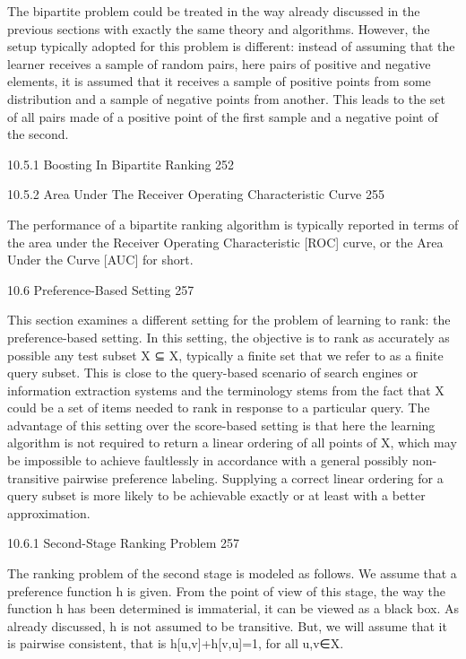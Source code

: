 The bipartite problem could be treated in the way already discussed in the previous sections with exactly the same theory and algorithms. However, the setup typically adopted for this problem is different: instead of assuming that the learner receives a sample of random pairs, here pairs of positive and negative elements, it is assumed that it receives a sample of positive points from some distribution and a sample of negative points from another. This leads to the set of all pairs made of a positive point of the first sample and a negative point of the second.

10.5.1 Boosting In Bipartite Ranking 252



10.5.2 Area Under The Receiver Operating Characteristic Curve 255

The performance of a bipartite ranking algorithm is typically reported in terms of the area under the Receiver Operating Characteristic [ROC] curve, or the Area Under the Curve [AUC] for short.

10.6 Preference-Based Setting 257

This section examines a different setting for the problem of learning to rank: the preference-based setting. In this setting, the objective is to rank as accurately as possible any test subset X ⊆ X, typically a finite set that we refer to as a finite query subset. This is close to the query-based scenario of search engines or information extraction systems and the terminology stems from the fact that X could be a set of items needed to rank in response to a particular query. The advantage of this setting over the score-based setting is that here the learning algorithm is not required to return a linear ordering of all points of X, which may be impossible to achieve faultlessly in accordance with a general possibly non-transitive pairwise preference labeling. Supplying a correct linear ordering for a query subset is more likely to be achievable exactly or at least with a better approximation.

10.6.1 Second-Stage Ranking Problem 257

The ranking problem of the second stage is modeled as follows. We assume that a preference function h is given. From the point of view of this stage, the way the function h has been determined is immaterial, it can be viewed as a black box. As already discussed, h is not assumed to be transitive. But, we will assume that it is pairwise consistent, that is h[u,v]+h[v,u]=1, for all u,v∈X.

